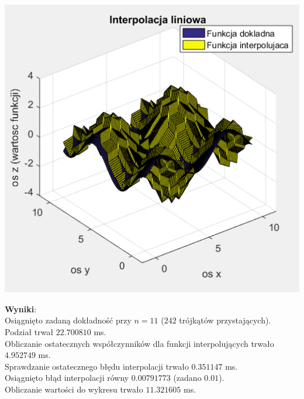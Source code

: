 \documentclass[12pt]{article}
\begin{document}
\begin{enumerate}[label=\textbf{Przykład \arabic*}]
		\includegraphics[]{images/example-6.png}
		
		\textbf{Wyniki}:\\
		Osiągnięto zadaną dokładność przy $n = 11$ ($242$ trójkątów przystających).\\
		Podział trwał $22.700810$ ms.\\
		Obliczanie ostatecznych współczynników dla funkcji interpolujących trwało $4.952749$ ms.\\
		Sprawdzanie ostatecznego błędu interpolacji trwało $0.351147$ ms.\\
		Osiągnięto błąd interpolacji równy $0.00791773$ (zadano $0.01$).\\
		Obliczanie wartości do wykresu trwało $11.321605$ ms.
		
		
	\end{enumerate}
	
\end{document}
